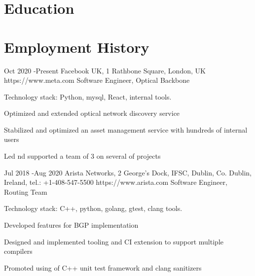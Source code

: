 \documentclass[9pt]{article} %
\begin{document}
\section{Education}

\vspace{-1mm}


\section{Employment History}

\job
{Oct 2020 -}{Present}
{Facebook UK, 1 Rathbone Square, London, UK}
{https://www.meta.com}
{Software Engineer, Optical Backbone}
{
Technology stack: Python, mysql, React, internal tools.
\begin{itemize-noindent}
\setlength\itemsep{-0.5em}
\item{Optimized and extended optical network discovery service}
\item{Stabilized and optimized an asset management service with hundreds of internal users}
\item{Led nd supported a team of 3 on several of projects}
\end{itemize-noindent}
}

\job
{Jul 2018 -}{Aug 2020}
{Arista Networks, 2 George's Dock, IFSC, Dublin, Co. Dublin, Ireland, tel.: +1-408-547-5500}
{https://www.arista.com}
{Software Engineer, Routing Team}
{
Technology stack: C++, python, golang, gtest, clang tools.
\begin{itemize-noindent}
\setlength\itemsep{-0.5em}
\item{Developed features for BGP implementation}
\item{Designed and implemented tooling and CI extension to support multiple compilers}
\item{Promoted using of C++ unit test framework and clang sanitizers}
\end{itemize-noindent}
}
\end{document}
